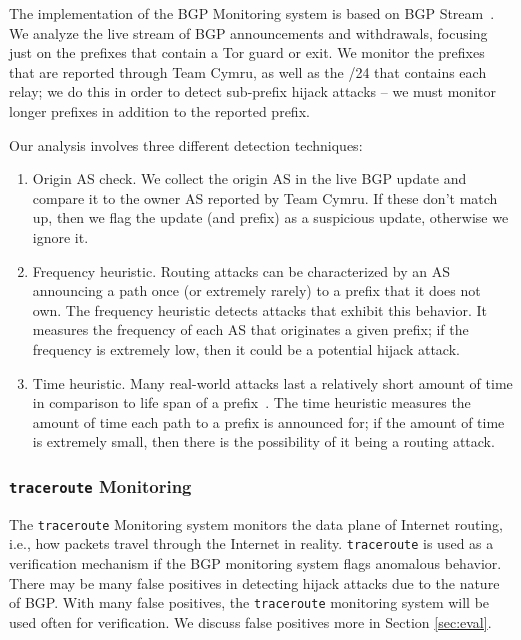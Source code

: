 The implementation of the BGP Monitoring system is based on BGP Stream~\cite{bgpstream}.  We analyze the live stream of BGP announcements and withdrawals, focusing just on the prefixes that contain a Tor guard or exit.  We monitor the prefixes that are reported through Team Cymru, as well as the /24 that contains each relay; we do this in order to detect sub-prefix hijack attacks -- we must monitor longer prefixes in addition to the reported prefix.  

Our analysis involves three different detection techniques:

\begin{enumerate}
\item Origin AS check.  We collect the origin AS in the live BGP update and compare it to the owner AS reported by Team Cymru.  If these don't match up, then we flag the update (and prefix) as a suspicious update, otherwise we ignore it. 
\item Frequency heuristic.  Routing attacks can be 
characterized by an AS announcing a path once (or extremely rarely) to a prefix 
that it does not own.  The frequency heuristic detects attacks that exhibit this behavior. 
It measures the frequency of each AS that originates a given prefix; if the frequency is 
extremely low, then it could be a potential hijack attack.
\item Time heuristic.  Many real-world attacks 
last a relatively short amount of time in comparison to life span of a prefix~\cite{indiahijack, syriahijack,indosat2014, malaysialeak}. The time heuristic measures the amount of time each 
path to a prefix is announced for; if the amount of time is extremely small, 
then there is the possibility of it being a routing attack. 
\end{enumerate}  

\subsubsection{{\tt traceroute} Monitoring} 
The {\tt traceroute} Monitoring system monitors the data plane of Internet routing, i.e., how packets travel through the Internet in reality. {\tt traceroute} is used as a verification mechanism if the BGP monitoring system flags anomalous behavior. There may be many false positives in detecting hijack attacks due to the nature of BGP.  With many false positives, the {\tt traceroute} monitoring system will be used often for verification.  We discuss false positives more in Section \ref{sec:eval}.

